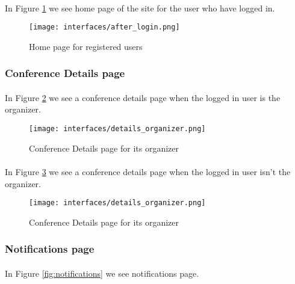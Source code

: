 		\paragraph{}
		In Figure \ref{fig:home-after-login} we see home page of the site for the user who have logged in.
		
		\begin{figure}[!ht]
			\centering
			\texttt{[image: interfaces/after\_login.png]}
			\caption{Home page for registered users}
			\label{fig:home-after-login}
		\end{figure}

	\subsubsection{Conference Details page}
		\paragraph{}
		In Figure \ref{fig:details-organizer} we see a conference details page when the logged in user is the organizer.
		
		\begin{figure}[!ht]
			\centering
			\texttt{[image: interfaces/details\_organizer.png]}
			\caption{Conference Details page for its organizer}
			\label{fig:details-organizer}
		\end{figure}

		\paragraph{}
		In Figure \ref{fig:details-non-organizer} we see a conference details page when the logged in user isn't the organizer.
		
		\begin{figure}[!ht]
			\centering
			\texttt{[image: interfaces/details\_organizer.png]}
			\caption{Conference Details page for its organizer}
			\label{fig:details-non-organizer}
		\end{figure}

	\subsubsection{Notifications page}
		\paragraph{}
		In Figure \ref{fig:notifications} we see notifications page.
		
